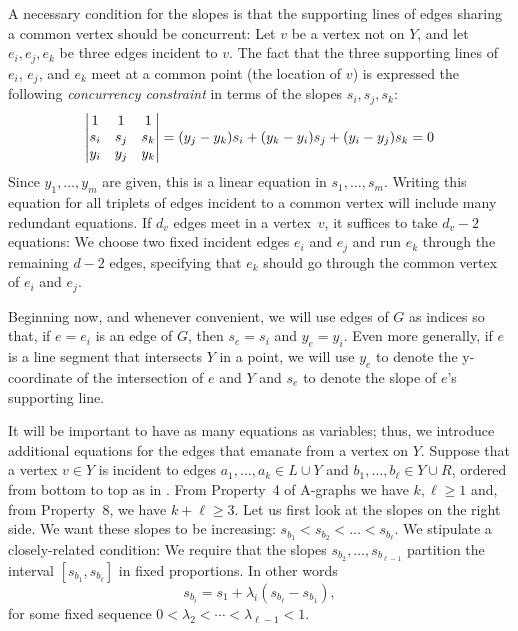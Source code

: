 \documentclass{patmorin}
\begin{document}
A necessary condition for the slopes is that the supporting lines of edges 
sharing 
a common vertex should be concurrent: Let $v$ be a vertex 
not on $Y$, and let $e_i, e_j, e_k$ be three edges incident to $v$.
The fact that the three supporting lines of $e_i$, $e_j$, and $e_k$
meet at a common point (the location of $v$) is expressed the following
\emph{concurrency constraint} in terms of the slopes $s_i,s_j,s_k$:
\begin{equation}\eqlabel{slope0} 
\left|
  \begin{matrix}
    1&1&1\\
s_i&s_j&s_k\\
y_i&y_j&y_k
  \end{matrix}
\right|=
   ({y_j-y_k}) s_i + ({y_k-y_i}) s_j 
          + ({y_i-y_j})s_k  = 0
\end{equation}
Since $y_1,\ldots,y_m$ are given, this is a linear equation
in $s_1,\ldots,s_m$.
Writing this equation for all triplets of edges incident to a common
vertex will include many redundant equations.
If $d_v$ edges meet in a vertex~$v$, 
 it suffices to take $d_v-2$ equations: We choose two fixed
incident edges $e_i$ and $e_j$ and run $e_k$ through the remaining
$d-2$ edges, specifying that $e_k$ should go through the common vertex
of $e_i$ and $e_j$.

Beginning now, and whenever convenient, we will use edges of $G$
as indices so that, if $e=e_i$ is an edge of $G$, then $s_e=s_i$
and $y_e=y_i$.  Even more generally, if $e$ is a line segment that
intersects $Y$ in a point, we will use $y_e$ to denote the y-coordinate
of the intersection of $e$ and $Y$ and $s_e$ to denote the slope of
$e$'s supporting line.

It will be important to have as many equations as variables;
thus, we introduce additional equations for the edges that emanate from a
vertex on $Y$.
Suppose that a vertex $v\in Y$ is incident to edges $a_1,\ldots,a_k\in L\cup Y$ 
and $b_1,\ldots,b_\ell\in Y\cup R$, ordered from bottom to top as in .
From Property~4 of A-graphs we have $k,\ell\ge1$ and, from Property~8, we have $k+\ell\ge 3$.
Let us first look at the slopes on the right side.
We want these slopes to be increasing:
$s_{b_1} < s_{b_2} < \dots  <s_{b_\ell}$. We stipulate a closely-related 
condition:
We require that the slopes
$s_{b_2}, \dots, s_{b_{\ell-1}}$ partition the interval
$[s_{b_1},s_{b_\ell}]$ in fixed proportions. In other words
\begin{equation}
  \label{eq:proportion}
s_{b_i} = s_1 + \lambda_i(s_{b_{\ell}}-s_{b_1}),
\end{equation}
for some fixed sequence $0<\lambda_2<\cdots<\lambda_{\ell-1}<1$.
\end{document}
